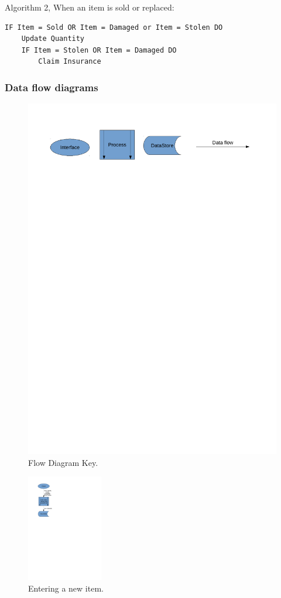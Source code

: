 \documentclass[a4paper,12pt]{report}
\begin{document}
Algorithm 2, When an item is sold or replaced:
\begin{lstlisting}
IF Item = Sold OR Item = Damaged or Item = Stolen DO
    Update Quantity
    IF Item = Stolen OR Item = Damaged DO
        Claim Insurance
\end{lstlisting}

\subsubsection{Data flow diagrams}

\begin{figure}[H]
    \caption{Flow Diagram Key.} \label{fig:print_function_result}
    \includegraphics[width=\textwidth]{./Dataflow/DFD_analysis_key.pdf}
\end{figure}

\begin{figure}[H]
    \caption{Entering a new item.} \label{fig:print_function_result}
    \includegraphics[width=125px]{./Dataflow/DFD_analysis_new_item.pdf}
\end{figure}
\end{document}
